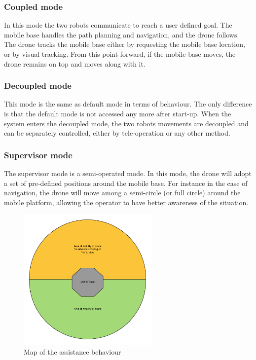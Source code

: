 \documentclass[11pt,a4paper]{article}
\begin{document}
\subsubsection{Coupled mode}
In this mode the two robots communicate to reach a user defined goal. The mobile base handles the path planning and navigation, and the drone follows. The drone tracks the mobile base either by requesting the mobile base location, or by visual tracking. From this point forward, if the mobile base moves, the drone remains on top and moves along with it.

\subsubsection{Decoupled mode}
This mode is the same as default mode in terms of behaviour. The only difference is that the default mode
is not accessed any more after start-up. When the system enters the decoupled mode, the two robots movements
are decoupled and can be separately controlled, either by tele-operation or any other method.

\subsubsection{Supervisor mode}
The supervisor mode is a semi-operated mode. In this mode, the drone will adopt a set of pre-defined
positions around the mobile base. For instance in the case of navigation, the drone will move 
among a semi-circle (or full circle) around the mobile platform, allowing the 
operator to have better awareness of the situation.

\begin{figure}[ht]	
\centering
\includegraphics[height=7cm]{assistanceBehavior.png}
\caption{Map of the assistance behaviour}
\end{figure}
\end{document}
